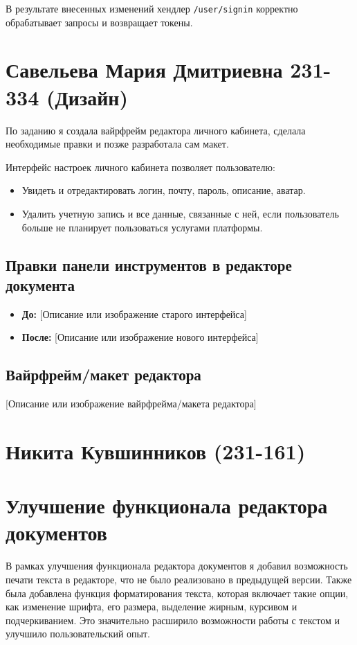 \documentclass[a4paper,12pt]{article}
\begin{document}
В результате внесенных изменений хендлер \texttt{/user/signin} корректно обрабатывает запросы и возвращает токены.

\section*{Савельева Мария Дмитриевна 231-334 (Дизайн)}
По заданию я создала вайрфрейм редактора личного кабинета, сделала необходимые правки и позже разработала сам макет.

Интерфейс настроек личного кабинета позволяет пользователю:
\begin{itemize}
    \item Увидеть и отредактировать логин, почту, пароль, описание, аватар.
    \item Удалить учетную запись и все данные, связанные с ней, если пользователь больше не планирует пользоваться услугами платформы.
\end{itemize}

\subsection*{Правки панели инструментов в редакторе документа}
\begin{itemize}
    \item \textbf{До:} [Описание или изображение старого интерфейса]
    \item \textbf{После:} [Описание или изображение нового интерфейса]
\end{itemize}

\subsection*{Вайрфрейм/макет редактора}
[Описание или изображение вайрфрейма/макета редактора]


\newpage

\section*{Никита Кувшинников (231-161)}
\section*{Улучшение функционала редактора документов}
В рамках улучшения функционала редактора документов я добавил возможность печати текста в редакторе, что не было реализовано в предыдущей версии. Также была добавлена функция форматирования текста, которая включает такие опции, как изменение шрифта, его размера, выделение жирным, курсивом и подчеркиванием. Это значительно расширило возможности работы с текстом и улучшило пользовательский опыт.
\end{document}
